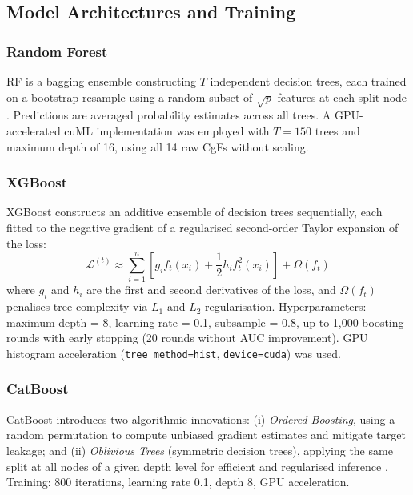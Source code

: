 \documentclass[12pt, a4paper]{article}
\begin{document}
\subsection{Model Architectures and Training}

\subsubsection{Random Forest}
RF is a bagging ensemble constructing $T$ independent decision trees, each trained on a bootstrap resample using a random subset of $\sqrt{p}$ features at each split node \citep{breiman2001, belgiu2016}. Predictions are averaged probability estimates across all trees. A GPU-accelerated cuML implementation was employed with $T = 150$ trees and maximum depth of 16, using all 14 raw CgFs without scaling.

\subsubsection{XGBoost}
XGBoost \citep{chen2016} constructs an additive ensemble of decision trees sequentially, each fitted to the negative gradient of a regularised second-order Taylor expansion of the loss:
\begin{equation}
    \mathcal{L}^{(t)} \approx \sum_{i=1}^{n} \left[g_i f_t(x_i) + \frac{1}{2}h_i f_t^2(x_i)\right] + \Omega(f_t)
\end{equation}
where $g_i$ and $h_i$ are the first and second derivatives of the loss, and $\Omega(f_t)$ penalises tree complexity via $L_1$ and $L_2$ regularisation. Hyperparameters: maximum depth = 8, learning rate = 0.1, subsample = 0.8, up to 1,000 boosting rounds with early stopping (20 rounds without AUC improvement). GPU histogram acceleration (\texttt{tree\_method=hist}, \texttt{device=cuda}) was used.

\subsubsection{CatBoost}
CatBoost \citep{prokhorenkova2018} introduces two algorithmic innovations: (i) \textit{Ordered Boosting}, using a random permutation to compute unbiased gradient estimates and mitigate target leakage; and (ii) \textit{Oblivious Trees} (symmetric decision trees), applying the same split at all nodes of a given depth level for efficient and regularised inference \citep{Dorogush2018}. Training: 800 iterations, learning rate 0.1, depth 8, GPU acceleration.
\end{document}
